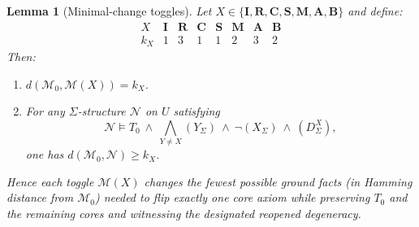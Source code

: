 \documentclass[12pt]{article}
\newtheorem{lemma}{Lemma}
\begin{document}
\begin{lemma}[Minimal-change toggles]
\label{lem:minchange}
Let $X\in\{\mathbf{I},\mathbf{R},\mathbf{C},\mathbf{S},\mathbf{M},\mathbf{A},\mathbf{B}\}$ and define:
\[
\begin{array}{c|ccccccc}
X & \mathbf{I} & \mathbf{R} & \mathbf{C} & \mathbf{S} & \mathbf{M} & \mathbf{A} & \mathbf{B}\\
\hline
k_X & 1 & 3 & 1 & 1 & 2 & 3 & 2
\end{array}
\]
Then:
\begin{enumerate}[label=(\alph*), leftmargin=2.2em]
\item $d(\mathcal{M}_0,\mathcal{M}(X))=k_X$.
\item For any $\Sigma$-structure $\mathcal{N}$ on $U$ satisfying
\[
\mathcal{N}\models T_0\ \wedge\ \bigwedge_{Y\neq X}(Y_\Sigma)\ \wedge\ \neg(X_\Sigma)\ \wedge\ (D^X_\Sigma),
\]
one has $d(\mathcal{M}_0,\mathcal{N})\ge k_X$.
\end{enumerate}
Hence each toggle $\mathcal{M}(X)$ changes the \emph{fewest possible} ground facts (in Hamming distance from $\mathcal{M}_0$)
needed to flip exactly one core axiom while preserving $T_0$ and the remaining cores and witnessing the designated reopened degeneracy.
\end{lemma}
\end{document}
